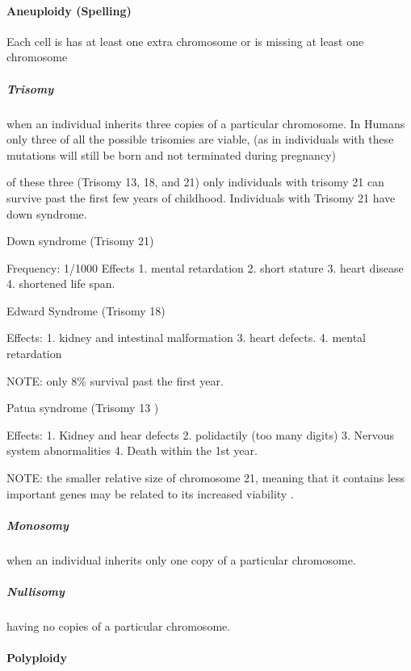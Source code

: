 \documentclass[]{article}
\let\oldparagraph\paragraph
\renewcommand{\paragraph}[1]{\oldparagraph{#1}\mbox{}}
\let\oldsubparagraph\subparagraph
\renewcommand{\subparagraph}[1]{\oldsubparagraph{#1}\mbox{}}
\begin{document}
\hypertarget{aneuploidy-spelling}{%
\paragraph{Aneuploidy (Spelling)}\label{aneuploidy-spelling}}

Each cell is has at least one extra chromosome or is missing at least
one chromosome

\hypertarget{trisomy}{%
\subparagraph{Trisomy}\label{trisomy}}

when an individual inherits three copies of a particular chromosome. In
Humans only three of all the possible trisomies are viable, (as in
individuals with these mutations will still be born and not terminated
during pregnancy)

of these three (Trisomy 13, 18, and 21) only individuals with trisomy 21
can survive past the first few years of childhood. Individuals with
Trisomy 21 have down syndrome.

Down syndrome (Trisomy 21)

Frequency: 1/1000 Effects 1. mental retardation 2. short stature 3.
heart disease 4. shortened life span.

Edward Syndrome (Trisomy 18)

Effects: 1. kidney and intestinal malformation 3. heart defects. 4.
mental retardation

NOTE: only 8\% survival past the first year.

Patua syndrome (Trisomy 13 )

Effects: 1. Kidney and hear defects 2. polidactily (too many digits) 3.
Nervous system abnormalities 4. Death within the 1st year.

NOTE: the smaller relative size of chromosome 21, meaning that it
contains less important genes may be related to its increased viability
.

\hypertarget{monosomy}{%
\subparagraph{Monosomy}\label{monosomy}}

when an individual inherits only one copy of a particular chromosome.

\hypertarget{nullisomy}{%
\subparagraph{Nullisomy}\label{nullisomy}}

having no copies of a particular chromosome.

\hypertarget{polyploidy}{%
\paragraph{Polyploidy}\label{polyploidy}}
\end{document}
